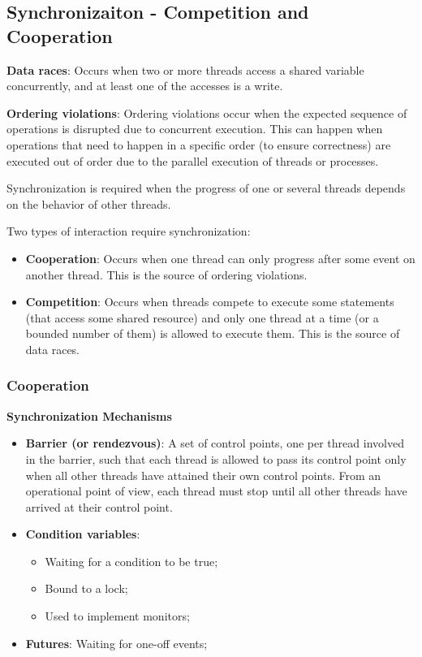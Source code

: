 \renewcommand{\image}[3]{\globimage{#1}{2}{#2}{#3}}
\renewcommand{\imagec}[4]{\globimagec{#1}{2}{#2}{#3}{#4}}
\renewcommand{\graphics}[2]{\texttt{[image: Images/Chapter 2/\#1]}}
\subsection{Synchronizaiton - Competition and Cooperation}
\par \textbf{Data races}: Occurs when two or more threads access a shared variable concurrently, and at least one of the accesses is a write.
\par \textbf{Ordering violations}: Ordering violations occur when the expected sequence of operations is disrupted due to concurrent execution. This can happen when operations that need to happen in a specific order (to ensure correctness) are executed out of order due to the parallel execution of threads or processes.
\par Synchronization is required when the progress of one or several threads depends on the behavior of other threads.
\par Two types of interaction require synchronization:
\begin{itemize}
    \item \textbf{Cooperation}: Occurs when one thread can only progress after some event on another thread. This is the source of ordering violations.
    \item \textbf{Competition}: Occurs when threads compete to execute some statements (that access some shared resource) and only one thread at a time (or a bounded number of them) is allowed to execute them. This is the source of data races.
\end{itemize}
\subsubsection{Cooperation}
\par {\large \textbf{Synchronization Mechanisms}}
\begin{itemize}
    \item \textbf{Barrier (or rendezvous)}: A set of control points, one per thread involved in the barrier, such that each thread is allowed to pass its control point only when all other threads have attained their own control points. From an operational point of view, each thread must stop until all other threads have arrived at their control point.
    \item \textbf{Condition variables}:
    \begin{itemize}
        \item Waiting for a condition to be true;
        \item Bound to a lock;
        \item Used to implement monitors;
    \end{itemize}
    \item \textbf{Futures}: Waiting for one-off events;
\end{itemize}

